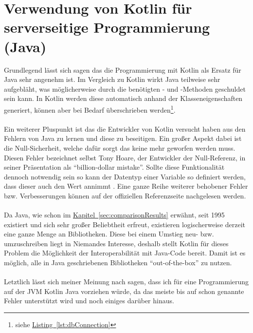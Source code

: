 \section{Verwendung von Kotlin für serverseitige Programmierung (Java)}\label{sec:conclusionKotlinJava}
Grundlegend lässt sich sagen das die Programmierung mit Kotlin als Ersatz für Java sehr angenehm ist. Im Vergleich zu Kotlin wirkt Java teilweise sehr aufgebläht, was möglicherweise durch die benötigten - und -Methoden geschuldet sein kann. In Kotlin werden diese automatisch anhand der Klasseneigenschaften generiert, können aber bei Bedarf überschrieben werden\footnote{siehe \hyperref[lst:dbConnection]{Listing~\ref{lst:dbConnection}}}.\\
\\
Ein weiterer Pluspunkt ist das die Entwickler von Kotlin versucht haben aus den Fehlern von Java zu lernen und diese zu beseitigen. Ein großer Aspekt dabei ist die Null-Sicherheit, welche dafür sorgt das keine  mehr geworfen werden muss. Diesen Fehler bezeichnet selbst Tony Hoare, der Entwickler der Null-Referenz, in seiner Präsentation \cite{billionDollorMistake} als \enquote{billion-dollar mistake}. Sollte diese Funktionalität dennoch notwendig sein so kann der Datentyp einer Variable so definiert werden, dass dieser auch den Wert  annimmt \cite{kotlinNullSafety}. Eine ganze Reihe weiterer behobener Fehler bzw. Verbesserungen können auf der offiziellen Referenzseite \cite{kotlinComparisionJava} nachgelesen werden.\\
\\
Da Java, wie schon im \hyperref[sec:comparisonResults]{Kapitel~\ref{sec:comparisonResults}} erwähnt, seit 1995 existiert und sich sehr großer Beliebtheit erfreut, existieren logischerweise derzeit eine ganze Menge an Bibliotheken. Diese bei einem Umstieg neu- bzw. umzuschreiben liegt in Niemandes Interesse, deshalb stellt Kotlin für dieses Problem die Möglichkeit der Interoperabilität mit Java-Code bereit. Damit ist es möglich, alle in Java geschriebenen Bibliotheken \enquote{out-of-the-box} zu nutzen.\\
\\
Letztlich lässt sich meiner Meinung nach sagen, dass ich für eine Programmierung auf der \gls{JVM} Kotlin Java vorziehen würde, da das meiste bis auf schon genannte Fehler unterstützt wird und noch einiges darüber hinaus.

